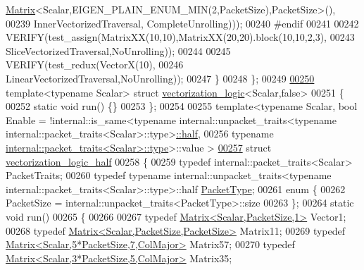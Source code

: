 \begin{DoxyCode}
      \hyperlink{group___core___module_class_eigen_1_1_matrix}{Matrix}<Scalar,EIGEN\_PLAIN\_ENUM\_MIN(2,PacketSize),PacketSize>(),
00239                         InnerVectorizedTraversal, CompleteUnrolling)));
00240 \textcolor{preprocessor}{    #endif}
00241 
00242     VERIFY(test\_assign(MatrixXX(10,10),MatrixXX(20,20).block(10,10,2,3),
00243       SliceVectorizedTraversal,NoUnrolling));
00244 
00245     VERIFY(test\_redux(VectorX(10),
00246       LinearVectorizedTraversal,NoUnrolling));
00247   \}
00248 \};
00249 
\hyperlink{structvectorization__logic_3_01_scalar_00_01false_01_4}{00250} \textcolor{keyword}{template}<\textcolor{keyword}{typename} Scalar> \textcolor{keyword}{struct }\hyperlink{structvectorization__logic}{vectorization\_logic}<Scalar,false>
00251 \{
00252   \textcolor{keyword}{static} \textcolor{keywordtype}{void} run() \{\}
00253 \};
00254 
00255 template<typename Scalar, bool Enable = !internal::is\_same<typename internal::unpacket\_traits<typename
       internal::packet\_traits<Scalar>::type>\hyperlink{struct_eigen_1_1half}{::half},
00256                                                            \textcolor{keyword}{typename} 
      \hyperlink{group___sparse_core___module}{internal::packet\_traits<Scalar>::type}>::value >
\hyperlink{structvectorization__logic__half}{00257} \textcolor{keyword}{struct }\hyperlink{structvectorization__logic__half}{vectorization\_logic\_half}
00258 \{
00259   \textcolor{keyword}{typedef} internal::packet\_traits<Scalar> PacketTraits;
00260   \textcolor{keyword}{typedef} \textcolor{keyword}{typename} internal::unpacket\_traits<typename internal::packet\_traits<Scalar>::type>::half 
      \hyperlink{union_eigen_1_1internal_1_1_packet}{PacketType};
00261   \textcolor{keyword}{enum} \{
00262     PacketSize = internal::unpacket\_traits<PacketType>::size
00263   \};
00264   \textcolor{keyword}{static} \textcolor{keywordtype}{void} run()
00265   \{
00266     
00267     \textcolor{keyword}{typedef} \hyperlink{group___core___module_class_eigen_1_1_matrix}{Matrix<Scalar,PacketSize,1>} Vector1;
00268     \textcolor{keyword}{typedef} \hyperlink{group___core___module_class_eigen_1_1_matrix}{Matrix<Scalar,PacketSize,PacketSize>} Matrix11;
00269     \textcolor{keyword}{typedef} \hyperlink{group___core___module_class_eigen_1_1_matrix}{Matrix<Scalar,5*PacketSize,7,ColMajor>} Matrix57;
00270     \textcolor{keyword}{typedef} \hyperlink{group___core___module_class_eigen_1_1_matrix}{Matrix<Scalar,3*PacketSize,5,ColMajor>} Matrix35;

\end{DoxyCode}
